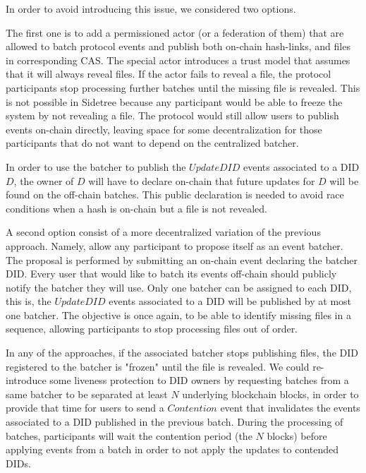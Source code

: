 \documentclass[10pt,a4paper]{article}
\begin{document}
In order to avoid introducing this issue, we considered two options. 

The first one is to add a permissioned actor (or a federation of them) that are allowed to batch protocol events and publish both on-chain hash-links,
and files in corresponding CAS. The special actor introduces a trust model that assumes that it will always reveal files. If the actor fails to 
reveal a file, the protocol participants stop processing further batches until the missing file is revealed. This is not possible in Sidetree because
any participant would be able to freeze the system by not revealing a file. The protocol would still allow users to publish events on-chain directly, 
leaving space for some decentralization for those participants that do not want to depend on the centralized batcher. 

In order to use the batcher to publish the $UpdateDID$ events associated to a DID $D$, the owner of $D$ will have to declare on-chain that future 
updates for $D$ will be found on the off-chain batches. This public declaration is needed to avoid race conditions when a hash is on-chain but
a file is not revealed.

A second option consist of a more decentralized variation of the previous approach. Namely, allow any participant to propose itself as an event 
batcher. The proposal is performed by submitting an on-chain event declaring the batcher DID. Every user that would like to batch its events 
off-chain should publicly notify the batcher they will use. Only one batcher can be assigned to each DID, this is, the $UpdateDID$ events associated 
to a DID will be published by at most one batcher. The objective is once again, to be able to identify missing files in a sequence, allowing 
participants to stop processing files out of order. 

In any of the approaches, if the associated batcher stops publishing files, the DID registered to the batcher is "frozen" until the file is revealed.
We could re-introduce some liveness protection to DID owners by requesting batches from a same batcher to be separated at least $N$ underlying 
blockchain blocks, in order to provide that time for users to send a $Contention$ event that invalidates the events associated to a DID published in
the previous batch. During the processing of batches, participants will wait the contention period (the $N$ blocks) before applying events from a 
batch in order to not apply the updates to contended DIDs.
\end{document}
